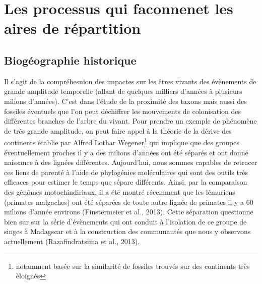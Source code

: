 \section*{Les processus qui faconnenet les aires de
répartition}\label{les-processus-qui-faconnenet-les-aires-de-ruxe9partition}

\subsection*{Biogéographie
historique}\label{bioguxe9ographie-historique}

Il s'agit de la compréhesnion des impactes sur les êtres vivants des
évènements de grande amplitude temporelle (allant de quelques milliers
d'années à plusieurs milions d'années). C'est dans l'étude de la
proximité des taxons mais aussi des fossiles éventuels que l'on peut
déchiffrer les mouvements de colonisation des différentes branches de
l'arbre du vivant. Pour prendre un exemple de phénomène de très grande
amplitude, on peut faire appel à la théorie de la dérive des continents
établie par Alfred Lothar Wegener\footnote{notamment basée sur la
  similarité de fossiles trouvés sur des continents très èloignés} qui
implique que des groupes éventuellement proches il y a des milions
d'années ont été séparés et ont donné naissance à des lignées
différentes. Aujourd'hui, nous sommes capables de retracer ces liens de
parenté à l'aide de phylogénies moléculaires qui sont des outils très
efficaces pour estimer le temps que sépare différents. Ainsi, par la
comparaison des génômes motochindiriaux, il a été montré récemment que
les lémuriens (primates malgaches) ont été séparées de toute autre
lignée de primates il y a 60 milions d'année environs (Finstermeier et
al., 2013). Cette séparation questionne bien sur sur la série
d'évènements qui ont conduit à l'isolation de ce groupe de singes à
Madagscar et à la construction des communautés que nous y observons
actuellement (Razafindratsima et al., 2013).


